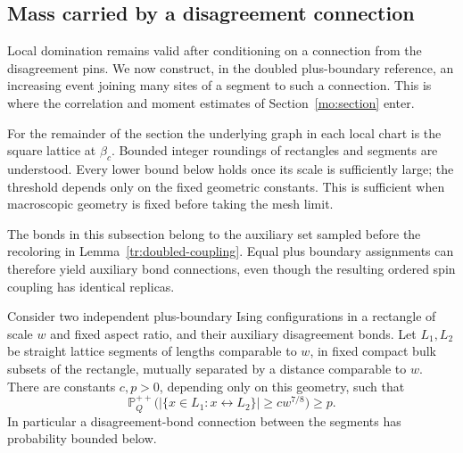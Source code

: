\subsection{Mass carried by a disagreement connection}
\label{tr:mass-subsection}

Local domination remains valid after conditioning on a connection from
the disagreement pins. We now construct, in the doubled plus-boundary
reference, an increasing event joining many sites of a segment to such
a connection. This is where the correlation and moment estimates of
Section~\ref{mo:section} enter.

For the remainder of the section the underlying graph in each local
chart is the square lattice at $\beta_c$. Bounded integer roundings of
rectangles and segments are understood. Every lower bound below holds
once its scale is sufficiently large; the threshold depends only on the
fixed geometric constants. This is sufficient when macroscopic geometry
is fixed before taking the mesh limit.

The bonds in this subsection belong to the auxiliary set sampled before
the recoloring in Lemma~\ref{tr:doubled-coupling}. Equal plus boundary
assignments can therefore yield auxiliary bond connections, even though
the resulting ordered spin coupling has identical replicas.

\begin{lemma}
\label{tr:many-sites}
Consider two independent plus-boundary Ising configurations in a rectangle
of scale $w$ and fixed aspect ratio, and their auxiliary disagreement
bonds. Let $L_1,L_2$ be straight lattice segments of lengths comparable to
$w$, in fixed compact bulk subsets of the rectangle, mutually separated
by a distance comparable to $w$. There are constants $c,p>0$, depending
only on this geometry, such that
\begin{equation}
\label{tr:many-sites-eq}
 \mathbb P_Q^{++}\bigl(
 |\{x\in L_1:x\longleftrightarrow L_2\}|\geq c w^{7/8}
 \bigr)\geq p.
\end{equation}
In particular a disagreement-bond connection between the segments has
probability bounded below.
\end{lemma}

